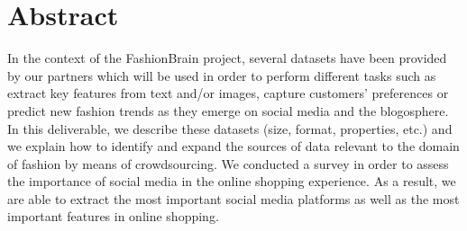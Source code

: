 \section*{Abstract}
\thispagestyle{plain}


In the context of the FashionBrain project, several datasets have been provided by our partners which
will be used in order to perform different tasks such as extract key features from text and/or images, capture customers’ preferences or predict new fashion trends as they emerge on social media and the blogosphere.  In this deliverable,
we describe these datasets (size, format, properties, etc.) and we explain how  to identify and expand the sources of data relevant to the domain of fashion by means of crowdsourcing. We conducted a survey in order to assess the importance of social media in the online shopping experience. As a result, we are able to extract the most important social media platforms as well as the most important features in online shopping. 
